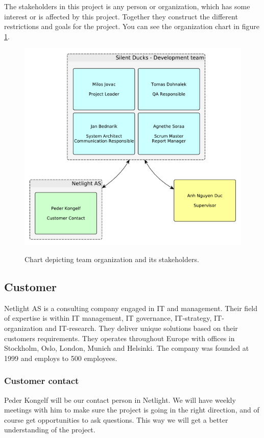 The stakeholders in this project is any person or organization, which has some interest or is affected by this project. Together they construct the different restrictions and goals for the project. 
You can see the organization chart in figure \ref{img:organization_chart}.

\begin{figure}[h]
    \begin{center}
    \includegraphics[scale=0.4]{images/organization_chart.pdf}
    \label{img:organization_chart}
    \caption{Chart depicting team organization and its stakeholders.}
    \end{center}
\end{figure}

\subsection{Customer}
Netlight AS is a consulting company engaged in IT and management. Their field of expertise is within IT management, IT governance, IT-strategy, IT-organization and IT-research. They deliver unique solutions based on their customers requirements. They operates throughout Europe with offices in Stockholm, Oslo, London, Munich and Helsinki. The company was founded at 1999 and employs to 500 employees. 
\subsubsection{Customer contact}
Peder Kongelf will be our contact person in Netlight. We will have weekly meetings with him to make sure the project is going in the right direction, and of course get opportunities to ask questions. This way we will get a better understanding of the project.

